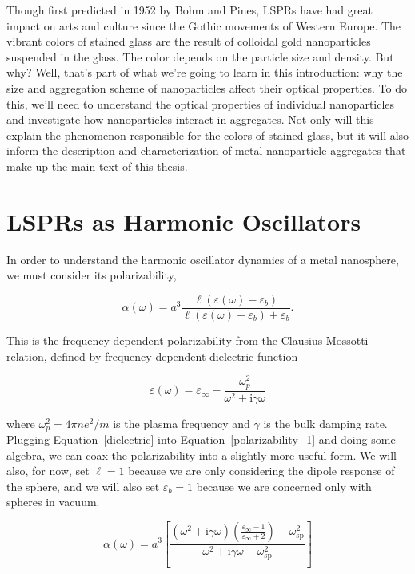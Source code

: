 \documentclass [11pt, proquest] {uwthesis}[2016/11/22]
\begin{document}
Though first predicted in 1952 by Bohm and Pines, LSPRs have had great impact on arts and culture since the Gothic movements of Western Europe. The vibrant colors of stained glass are the result of colloidal gold nanoparticles suspended in the glass. The color depends on the particle size and density. But why? Well, that's part of what we're going to learn in this introduction: why the size and aggregation scheme of nanoparticles affect their optical properties. To do this, we'll need to understand the optical properties of individual nanoparticles and investigate how nanoparticles interact in aggregates. Not only will this explain the phenomenon responsible for the colors of stained glass, but it will also inform the description and characterization of metal nanoparticle aggregates that make up the main text of this thesis.

\section{LSPRs as Harmonic Oscillators}

In order to understand the harmonic oscillator dynamics of a metal nanosphere, we must consider its polarizability,

\begin{equation}
\alpha(\omega) = a^3\frac{\ell(\varepsilon(\omega)-\varepsilon_b)}{\ell(\varepsilon(\omega)+\varepsilon_b)+\varepsilon_b}.
\label{polarizability_1}
\end{equation}

This is the frequency-dependent polarizability from the Clausius-Mossotti relation, defined by frequency-dependent dielectric function 

\begin{equation}
\varepsilon(\omega) = \varepsilon_{\infty} - \frac{\omega_p^2}{\omega^2+\textrm{i}\gamma\omega}
\label{dielectric}
\end{equation}

where $\omega_p^2 = 4\pi ne^2/m$ is the plasma frequency and $\gamma$ is the bulk damping rate. Plugging Equation~\ref{dielectric} into Equation~\ref{polarizability_1} and doing some algebra, we can coax the polarizability into a slightly more useful form. We will also, for now, set $\ell = 1$ because we are only considering the dipole response of the sphere, and we will also set $\varepsilon_b = 1$ because we are concerned only with spheres in vacuum.

\begin{equation}
\alpha(\omega) = a^3\left[\frac{\left(\omega^2+\textrm{i}\gamma\omega\right)\left(\frac{\varepsilon_{\infty}-1}{\varepsilon_{\infty}+2}\right)-\omega_{\textrm{sp}}^2}{\omega^2+\textrm{i}\gamma\omega-\omega_{\textrm{sp}}^2}\right]
\label{polarizability_2}
\end{equation}
\end{document}
